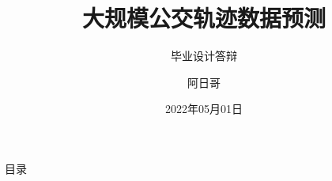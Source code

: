 \documentclass[aspectratio=169]{beamer}
\author{阿日哥}
\title{大规模公交轨迹数据预测}
\subtitle{毕业设计答辩}
\institute{武汉大学计算机学院}
\date{2022年05月01日}
\begin{document}
\kaishu
\begin{frame}
    \titlepage
\end{frame}

\begin{frame}{目录}
                
        \transfade %
        \tableofcontents
\end{frame}









\end{document}
